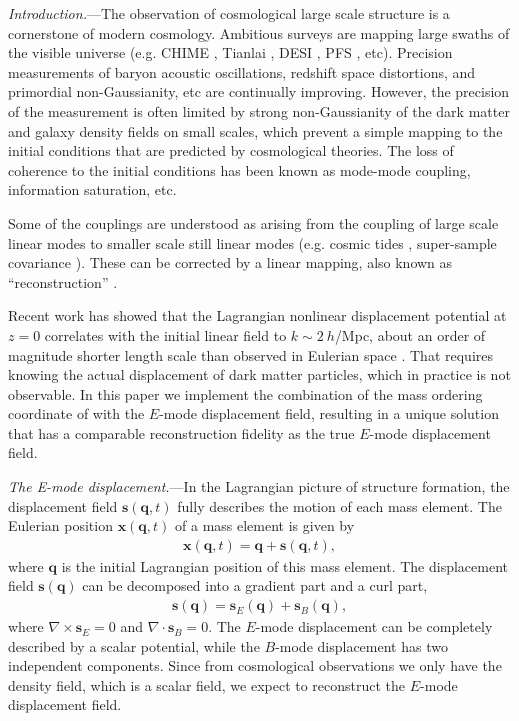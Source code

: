 \documentclass[aps,prl,twocolumn,showpacs,superscriptaddress,groupedaddress,nofootinbib]{revtex4}  %
\newcommand{\bea}{\begin{eqnarray}}
\newcommand{\eea}{\end{eqnarray}}
\begin{document}
\pacs{}
\maketitle


{\it Introduction.}---The observation of cosmological large scale structure 
is a cornerstone of modern cosmology.  
Ambitious surveys are mapping large swaths of the
visible universe (e.g. CHIME \cite{chime}, Tianlai \cite{tianlai}, DESI \cite{desi}, PFS \cite{pfs}, etc).  
Precision measurements of baryon acoustic oscillations, 
redshift space distortions, and primordial non-Gaussianity, etc
are continually improving.
However, the precision of the measurement is often limited by strong non-Gaussianity
of the dark matter and galaxy density fields on small scales, which prevent 
a simple mapping to the
initial conditions that are predicted by cosmological theories.  The
loss of coherence to the initial conditions has been known as
mode-mode coupling, information saturation, etc.

Some of the couplings are understood as arising from the coupling of
large scale linear modes to smaller scale still linear modes
(e.g. cosmic tides \cite{2012tides1,2016tides2,2016tides3}, super-sample covariance \cite{2013sc1,2014sc2,2014sc3}).  These can be corrected by a
linear mapping, also known as ``reconstruction'' \cite{2007bao}.

Recent work has showed that the Lagrangian nonlinear
displacement potential at $z=0$ correlates with the initial linear field 
to $k\sim 2\ h$/Mpc, about an order of magnitude shorter
length scale than observed in Eulerian space \cite{2016yu}.  That requires
knowing the actual displacement of dark matter particles, which in
practice is not observable.  In this paper we implement the
combination of the mass ordering coordinate of \cite{2016arXiv160907041Z} with the
$E$-mode displacement field, resulting in a unique solution that has a
comparable reconstruction fidelity as the true $E$-mode displacement field.

{\it The E-mode displacement.}---In the Lagrangian picture of structure 
formation, 
the displacement field $\bm{s}(\bm{q},t)$ fully describes the motion of each mass element. The Eulerian position $\bm{x}(\bm{q},t)$ of a mass element is given by
\bea
\bm{x}(\bm{q},t)=\bm{q}+\bm{s}(\bm{q},t),
\eea
where $\bm{q}$ is the initial Lagrangian position of this mass element.
The displacement field $\bm{s}(\bm{q})$ can be decomposed into a gradient part
and a curl part,
\bea
\bm{s}(\bm{q})=\bm{s}_E(\bm{q})+\bm{s}_B(\bm{q}),
\eea
where $\nabla\times\bm{s}_E=0$ and $\nabla\cdot\bm{s}_B=0$.
The $E$-mode displacement can be completely described by a scalar potential,
while the $B$-mode displacement has two independent components.
Since from cosmological observations we only have the density field,
which is a scalar field, we expect 
to reconstruct the $E$-mode displacement field.
\end{document}
